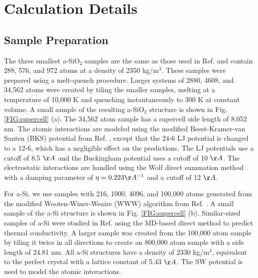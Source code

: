 \documentclass[aps,prb,twocolumn,superscriptaddress,footinbib,amsmath,amssymb,floatfix]{revtex4}
\begin{document}
\section{\label{S:Calculation}Calculation Details}

\subsection{\label{S:Sample}Sample Preparation}

The three smallest a-SiO$_2$ samples are the same as those used 
in Ref.  
and contain 288, 576, and 972 atoms at a density of 2350 kg/m$^3$. 
These samples were 
prepared using a melt-quench procedure. 
Larger systems of 2880, 4608, and 34,562 atoms were created by 
tiling the smaller samples, melting at a temperature of 10,000 K 
and quenching instantaneously to 300 K at constant volume. 
A small sample of the resulting a-SiO$_2$ structure is shown in 
Fig. \ref{FIG:supercell} (a). 
The 34,562 atom sample 
has a supercell side length of 8.052 nm. 
The atomic interactions are modeled using 
the modified Beest-Kramer-van Santen (BKS) potential
\cite{van_Beest_force_1990,kramer_interatomic_1991}
from Ref. 
, except that the 24-6 
LJ potential\cite{guissani_numerical_1996} 
is changed to a 12-6, 
which has a negligible effect on the predictions.  
The LJ potentials use a cutoff of 8.5 $\AA$ and the Buckingham 
potential uses a cutoff of 10 $\AA$. 
The electrostatic interactions are handled using the Wolf direct 
summation method with 
a damping parameter of $\eta=0.223 \AA^{-1}$ and a cutoff 
of 12 $\AA$.\cite{wolf_exact_1999} 

For a-Si, we use samples 
with 216, 1000, 4096, and 100,000 atoms generated from the 
modified Wooten-Winer-Weaire (WWW) algorithm 
from Ref. . 
A small sample of the a-Si structure is shown in 
Fig. \ref{FIG:supercell} (b). 
Similar-sized  
samples of a-Si were studied in Ref.  
using the 
MD-based direct method to predict thermal conductivity. 
A larger sample was created from the 100,000 atom sample 
by tiling it twice in all directions to create an 
800,000 atom sample with a side length of 24.81 nm.  
All a-Si structures have a density of 2330 kg/m$^3$, 
equivalent to the perfect 
crystal with a lattice constant of 5.43 $\AA$. 
The SW potential is used to model the atomic 
interactions.\cite{stillinger_computer_1985}   
\end{document}
